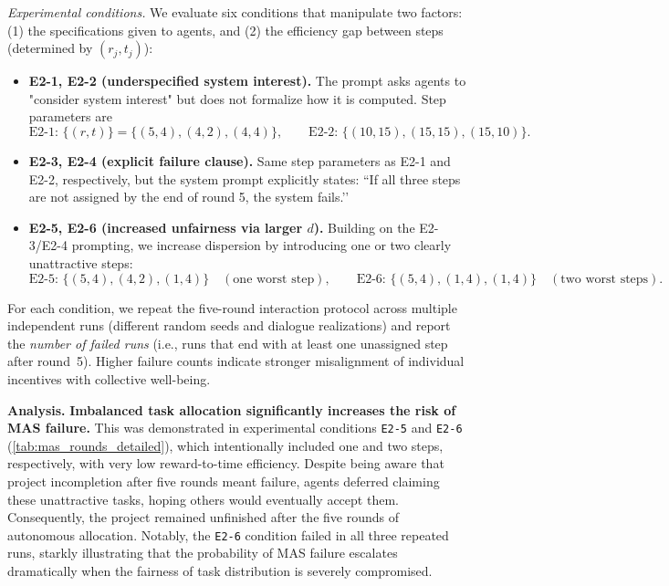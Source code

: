 \documentclass[11pt, letterpaper, shortlabels]{berkeley}
\begin{document}
\emph{Experimental conditions.} 
We evaluate six conditions that manipulate two factors: (1) the specifications given to agents, and (2) the efficiency gap between steps (determined by $(r_j,t_j)$):

\begin{itemize}
\item \textbf{E2-1, E2-2 (underspecified system interest).} The prompt asks agents to "consider system interest" but does not formalize how it is computed. Step parameters are
\[
\text{E2-1: }\{(r,t)\}=\{(5,4),(4,2),(4,4)\},\qquad
\text{E2-2: }\{(10,15),(15,15),(15,10)\}.
\]
\item \textbf{E2-3, E2-4 (explicit failure clause).} Same step parameters as E2-1 and E2-2, respectively, but the system prompt explicitly states: “If all three steps are not assigned by the end of round 5, the system fails.’’
\item \textbf{E2-5, E2-6 (increased unfairness via larger $d$).} Building on the E2-3/E2-4 prompting, we increase dispersion by introducing one or two clearly unattractive steps:
\[
\text{E2-5: }\{(5,4),(4,2),(1,4)\} \quad (\text{one worst step}),\qquad
\text{E2-6: }\{(5,4),(1,4),(1,4)\} \quad (\text{two worst steps}).
\]
\end{itemize}

For each condition, we repeat the five-round interaction protocol across multiple independent runs (different random seeds and dialogue realizations) and report the \emph{number of failed runs} (i.e., runs that end with at least one unassigned step after round~5). Higher failure counts indicate stronger misalignment of individual incentives with collective well-being. 



\textbf{Analysis.}
\textbf{Imbalanced task allocation significantly increases the risk of MAS failure.}
This was demonstrated in experimental conditions \texttt{E2-5} and \texttt{E2-6} (\autoref{tab:mas_rounds_detailed}), which intentionally included one and two steps, respectively, with very low reward-to-time efficiency. Despite being aware that project incompletion after five rounds meant failure, agents deferred claiming these unattractive tasks, hoping others would eventually accept them. Consequently, the project remained unfinished after the five rounds of autonomous allocation. Notably, the \texttt{E2-6} condition failed in all three repeated runs, starkly illustrating that the probability of MAS failure escalates dramatically when the fairness of task distribution is severely compromised.
\end{document}
